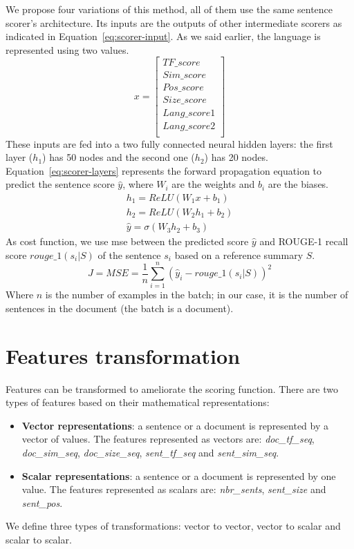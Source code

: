 We propose four variations of this method, all of them use the same sentence scorer's architecture. 
Its inputs are the outputs of other intermediate scorers as indicated in Equation~\ref{eq:scorer-input}. 
As we said earlier, the language is represented using two values. 
\begin{equation}
\label{eq:scorer-input}
x = \begin{bmatrix}
TF\_score\\ 
Sim\_score\\ 
Pos\_score\\ 
Size\_score\\ 
Lang\_score1\\ 
Lang\_score2\\ 
\end{bmatrix} 
\end{equation}
These inputs are fed into a two fully connected neural hidden layers: the first layer ($ h_1 $) has 50 nodes and the second one ($ h_2 $) has 20 nodes. 
Equation~\ref{eq:scorer-layers} represents the forward propagation equation to predict the sentence score $ \hat{y} $, where $ W_i $ are the weights and $ b_i $ are the biases.
\begin{align}
\label{eq:scorer-layers}
h_1 = ReLU(W_1 x + b_1 ) \nonumber\\
h_2 = ReLU(W_2 h_1 + b_2) \\
\hat{y} = \sigma(W_3 h_2 + b_3) \nonumber
\end{align}
As cost function, we use \ac{mse}  between the predicted score $ \hat{y} $ and ROUGE-1 recall score $ rouge\_1(s_i|S) $ of the sentence $ s_i $ based on a reference summary $ S $. 
\begin{equation}
\label{eq:scorer-mse}
J = MSE = \frac{1}{n} \sum\limits_{i=1}^{n} (\hat{y}_i - rouge\_1(s_i|S))^2
\end{equation}
Where $ n $ is the number of examples in the batch; in our case, it is the number of sentences in the document (the batch is a document). 


\section{Features transformation}

Features can be transformed to ameliorate the scoring function. 
There are two types of features based on their mathematical representations: 
\begin{itemize}
	\item \textbf{Vector representations}: a sentence or a document is represented by a vector of values. 
	The features represented as vectors are: \textit{doc\_tf\_seq}, \textit{doc\_sim\_seq}, \textit{doc\_size\_seq}, \textit{sent\_tf\_seq} and \textit{sent\_sim\_seq}.
	\item \textbf{Scalar representations}: a sentence or a document is represented by one value. 
	The features represented as scalars are: \textit{nbr\_sents}, \textit{sent\_size} and \textit{sent\_pos}.
\end{itemize}
We define three types of transformations: vector to vector, vector to scalar and scalar to scalar.

